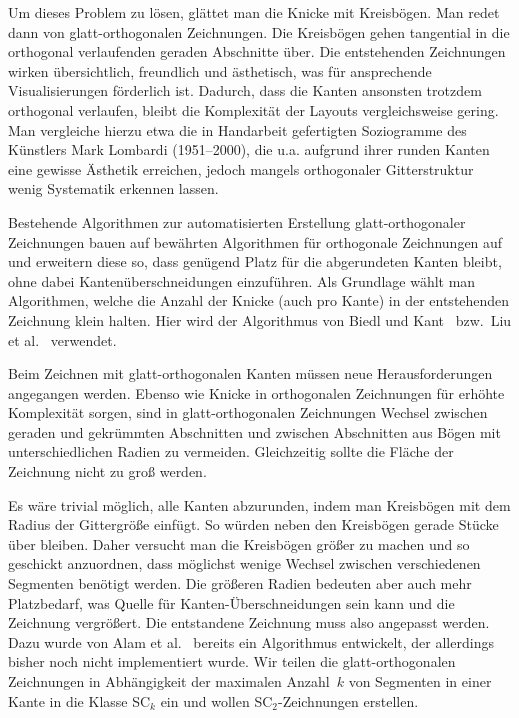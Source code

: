 \documentclass[a4paper]{scrreprt}
\theoremstyle{definition}
\newcommand{\go}{glatt-or\-tho\-go\-nal}
\begin{document}
Um dieses Problem zu lösen, glättet man die Knicke mit Kreisbögen. Man redet dann von glatt-orthogonalen Zeichnungen. Die Kreisbögen gehen tangential in die orthogonal verlaufenden geraden Abschnitte über. Die entstehenden Zeichnungen wirken übersichtlich, freundlich und ästhetisch, was für ansprechende Visualisierungen förderlich ist. Dadurch, dass die Kanten ansonsten trotzdem orthogonal verlaufen, bleibt die Komplexität der Layouts vergleichsweise gering. Man vergleiche hierzu etwa die in Handarbeit gefertigten Soziogramme des Künstlers Mark Lombardi (1951--2000), die u.a. aufgrund ihrer runden Kanten eine gewisse Ästhetik erreichen, jedoch mangels orthogonaler Gitterstruktur wenig Systematik erkennen lassen. 

Bestehende Algorithmen zur automatisierten Erstellung glatt-orthogonaler Zeichnungen bauen auf bewährten Algorithmen für orthogonale Zeichnungen auf und erweitern diese so, dass genügend Platz für die abgerundeten Kanten bleibt, ohne dabei Kantenüberschneidungen einzuführen. Als Grundlage wählt man Algorithmen, welche die Anzahl der Knicke (auch pro Kante) in der entstehenden Zeichnung klein halten. Hier wird der Algorithmus von Biedl und Kant~\cite{biedl+kant-98} bzw.\ Liu et al.~\cite{liu+etal-98} verwendet.

Beim Zeichnen mit \go en Kanten müssen neue Herausforderungen angegangen werden. Ebenso wie Knicke in orthogonalen Zeichnungen für erhöhte Komplexität sorgen, sind in glatt-orthogonalen Zeichnungen Wechsel zwischen geraden und gekrümmten Abschnitten und zwischen Abschnitten aus Bögen mit unterschiedlichen Radien zu vermeiden. Gleichzeitig sollte die Fläche der Zeichnung nicht zu groß werden.

Es wäre trivial möglich, alle Kanten abzurunden, indem man Kreisbögen mit dem Radius der Gittergröße einfügt. So würden neben den Kreisbögen gerade Stücke über bleiben. Daher versucht man die Kreisbögen größer zu machen und so geschickt anzuordnen, dass möglichst wenige Wechsel zwischen verschiedenen Segmenten benötigt werden. Die größeren Radien bedeuten aber auch mehr Platzbedarf, was Quelle für Kanten-Überschneidungen sein kann und die Zeichnung vergrößert. Die entstandene Zeichnung muss also angepasst werden. Dazu wurde von Alam et al.~\cite{smooth-13} bereits ein Algorithmus entwickelt, der allerdings bisher noch nicht implementiert wurde. Wir teilen die glatt-orthogonalen Zeichnungen in Abhängigkeit der maximalen Anzahl~$k$ von Segmenten in einer Kante in die Klasse SC$_k$ ein und wollen SC$_2$-Zeichnungen erstellen.
\end{document}

